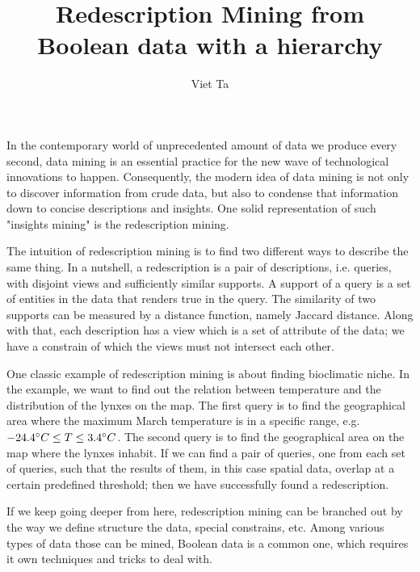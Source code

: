 \documentclass[12pt,a4paper,draft]{article}
\author{Viet Ta}
\title{Redescription Mining from Boolean data with a hierarchy}
\begin{document}
\maketitle

In the contemporary world of unprecedented amount of data we produce every second, data mining is an essential practice for the new wave of technological innovations to happen. Consequently, the modern idea of data mining is not only to discover information from crude data, but also to condense that information down to concise descriptions and insights. One solid representation of such "insights mining" is the redescription mining.

The intuition of redescription mining is to find two different ways to describe the same thing.
In a nutshell, a redescription is a pair of descriptions, i.e. queries, with disjoint views and sufficiently similar supports. %
A support of a query is a set of entities in the data that renders true in the query. The similarity of two supports can be measured by a distance function, namely Jaccard distance. Along with that, each description has a view which is a set of attribute of the data; we have a constrain of which the views must not intersect each other.

One classic example of redescription mining is about finding bioclimatic niche. In the example, we want to find out the relation between temperature and the distribution of the lynxes on the map. The first query is to find the geographical area where the maximum March temperature is in a specific range, e.g. \(-24.4 \degree C \leq T \leq 3.4\degree C\). The second query is to find the geographical area on the map where the lynxes inhabit. If we can find a pair of queries, one from each set of queries, such that the results of them, in this case spatial data, overlap at a certain predefined threshold; then we have successfully found a redescription.

If we keep going deeper from here, redescription mining can be branched out by the way we define structure the data, special constrains, etc. Among various types of data those can be mined, Boolean data is a common one, which requires it own techniques and tricks to deal with.
\end{document}
